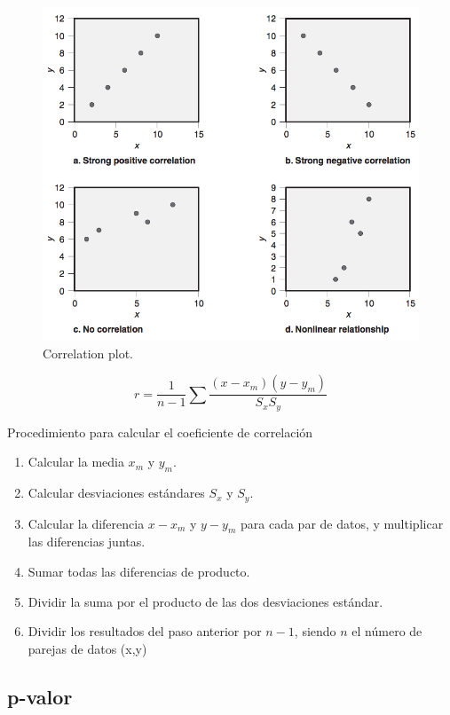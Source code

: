 \documentclass[oneside]{book}
\begin{document}
\begin{figure}[H]
	\centering
	\includegraphics[width=120mm]{imagenes/Correlation.png}
	\caption{Correlation plot.}
	\label{fig:Correlation}
\end{figure}

\begin{equation}
r = \frac{1}{n-1} \sum \frac{(x-x_m)(y-y_m)}{S_xS_y}
\end{equation}

Procedimiento para calcular el coeficiente de correlación

\begin{enumerate}
	\item Calcular la media $x_m$ y $y_m$.
	\item Calcular desviaciones estándares $S_x$ y $S_y$.
	\item Calcular la diferencia $x-x_m$ y $y-y_m$ para cada par de datos, y multiplicar las diferencias juntas.
	\item Sumar todas las diferencias de producto. 
	\item Dividir la suma por el producto de las dos desviaciones estándar. 
	\item Dividir los resultados del paso anterior por $n-1$, siendo $n$ el número de parejas de datos (x,y)
\end{enumerate}

\subsection{p-valor}
\end{document}

